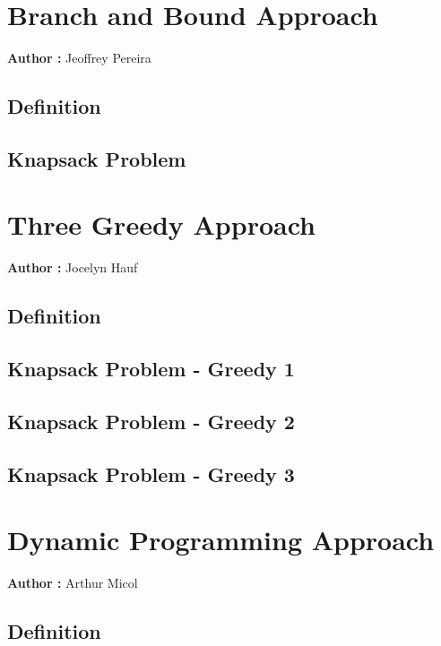 \documentclass[12pt]{article}
\begin{document}
\section{Branch and Bound Approach}

    \textbf{Author :} Jeoffrey Pereira

    \subsection{Definition}
    
    \subsection{Knapsack Problem}

\section{Three Greedy Approach}

    \textbf{Author :} Jocelyn Hauf

    \subsection{Definition}
    
    \subsection{Knapsack Problem - Greedy 1}
    
    \subsection{Knapsack Problem - Greedy 2}
    
    \subsection{Knapsack Problem - Greedy 3}

\section{Dynamic Programming Approach}

    \textbf{Author :} Arthur Micol

    \subsection{Definition}
    
\end{document}
